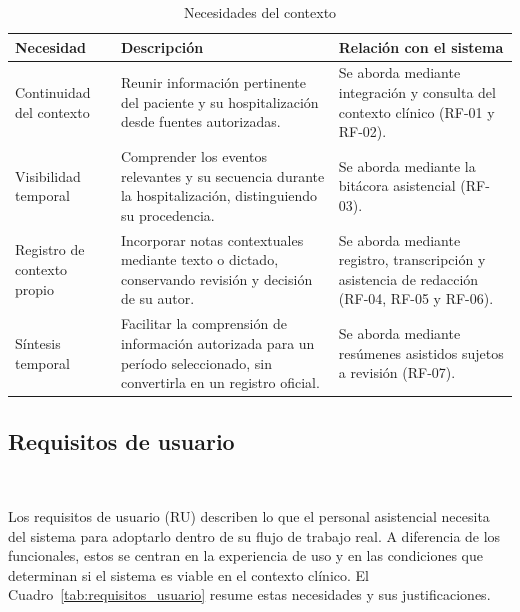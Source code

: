 \begin{table}[H]
\caption{Necesidades del contexto}
\label{tab:requisitos_funcionales_contexto}
\begin{tabularx}{\textwidth}{|l|X|X|}
\hline
\textbf{Necesidad} & \textbf{Descripción} & \textbf{Relación con el sistema} \\
\hline
Continuidad del contexto & Reunir información pertinente del paciente y su hospitalización desde fuentes autorizadas. & Se aborda mediante integración y consulta del contexto clínico (RF-01 y RF-02). \\
\hline
Visibilidad temporal & Comprender los eventos relevantes y su secuencia durante la hospitalización, distinguiendo su procedencia. & Se aborda mediante la bitácora asistencial (RF-03). \\
\hline
Registro de contexto propio & Incorporar notas contextuales mediante texto o dictado, conservando revisión y decisión de su autor. & Se aborda mediante registro, transcripción y asistencia de redacción (RF-04, RF-05 y RF-06). \\
\hline
Síntesis temporal & Facilitar la comprensión de información autorizada para un período seleccionado, sin convertirla en un registro oficial. & Se aborda mediante resúmenes asistidos sujetos a revisión (RF-07). \\
\hline
\end{tabularx}
\end{table}

\subsection*{Requisitos de usuario}~

Los requisitos de usuario (RU) describen lo que el personal asistencial necesita del sistema para adoptarlo dentro de su flujo de trabajo real. A diferencia de los funcionales, estos se centran en la experiencia de uso y en las condiciones que determinan si el sistema es viable en el contexto clínico. El Cuadro~\ref{tab:requisitos_usuario} resume estas necesidades y sus justificaciones.

